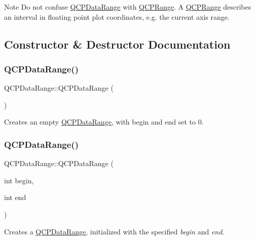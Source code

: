\begin{DoxyNote}{Note}
Do not confuse \mbox{\hyperlink{class_q_c_p_data_range}{Q\+C\+P\+Data\+Range}} with \mbox{\hyperlink{class_q_c_p_range}{Q\+C\+P\+Range}}. A \mbox{\hyperlink{class_q_c_p_range}{Q\+C\+P\+Range}} describes an interval in floating point plot coordinates, e.\+g. the current axis range. 
\end{DoxyNote}


\subsection{Constructor \& Destructor Documentation}
\mbox{\label{class_q_c_p_data_range_a49e72fd9bace1da9d875136dcc04c986}} 
\subsubsection{\texorpdfstring{QCPDataRange()}{QCPDataRange()}\hspace{0.1cm}{\footnotesize\ttfamily [1/2]}}
{\footnotesize\ttfamily Q\+C\+P\+Data\+Range\+::\+Q\+C\+P\+Data\+Range (\begin{DoxyParamCaption}{ }\end{DoxyParamCaption})}

Creates an empty \mbox{\hyperlink{class_q_c_p_data_range}{Q\+C\+P\+Data\+Range}}, with begin and end set to 0. \mbox{\label{class_q_c_p_data_range_a6c7f4a3684210423270515403060e9cf}} 
\subsubsection{\texorpdfstring{QCPDataRange()}{QCPDataRange()}\hspace{0.1cm}{\footnotesize\ttfamily [2/2]}}
{\footnotesize\ttfamily Q\+C\+P\+Data\+Range\+::\+Q\+C\+P\+Data\+Range (\begin{DoxyParamCaption}\item[{int}]{begin,  }\item[{int}]{end }\end{DoxyParamCaption})}

Creates a \mbox{\hyperlink{class_q_c_p_data_range}{Q\+C\+P\+Data\+Range}}, initialized with the specified {\itshape begin} and {\itshape end}.

